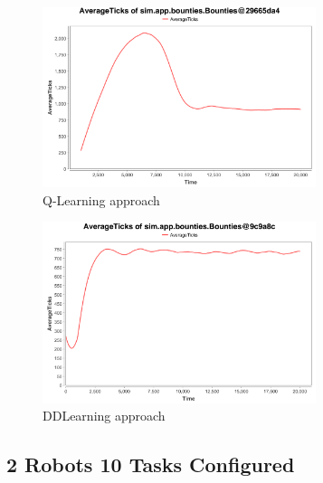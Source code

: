 \documentclass[twocolumn]{article}
\begin{document}
\begin{figure}[H]
\includegraphics[width=8cm]{qlearning8and300}
\caption{Q-Learning approach}
\end{figure}
\begin{figure}[H]
\includegraphics[width=8cm]{dd8and300}
\caption{DDLearning approach}
\end{figure}

\subsection{2 Robots 10 Tasks Configured}
\end{document}

